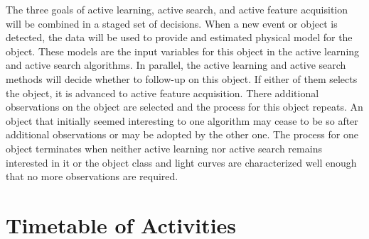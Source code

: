 \documentclass[useAMS,usenatbib,tightenlines,11pt,preprint]{aastex}
\begin{document}
The three goals of active learning, active search, and active feature
acquisition will be combined
in a staged set of decisions.  When a new event or object is detected, the data
will be used to provide and estimated physical model for the object.
These models are the input variables for this object in the active
learning and active search algorithms.  In parallel, the active learning
and active search methods will decide whether to follow-up on this object.
If either of them selects the object, it is advanced to active feature
acquisition.  There additional observations on the object are selected and
the process for this object repeats.  An object that initially seemed
interesting to one algorithm may cease to be so after additional
observations or may be adopted by the other one.  The process for one
object terminates when neither active learning nor active search remains
interested in it or the object class and light curves are characterized
well enough that no more observations are required.

\section{Timetable of Activities}
\end{document}
